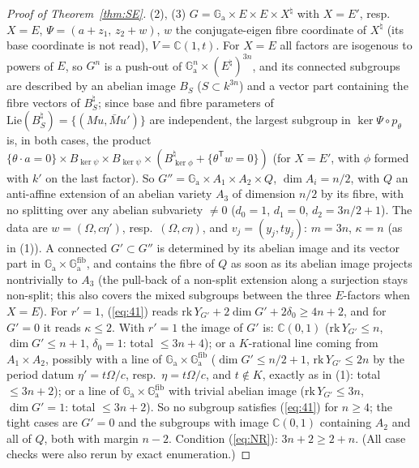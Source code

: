 \documentclass[11pt]{amsart}
\theoremstyle{definition}
\newcommand{\C}{\mathbb{C}}
\newcommand{\Ga}{\mathbb{G}_{\mathrm a}}
\begin{document}
\begin{proof}[Proof of Theorem~\ref{thm:SE}]
(2), (3) $G=\Ga\times E\times E\times X^\natural$ with $X=E'$, resp.\ $X=E$, $\Psi=(a+z_1,\,z_2+w)$, $w$ the conjugate-eigen
fibre coordinate of $X^\natural$ (its base coordinate is not read), $V=\C(1,t)$. For $X=E$ all factors are isogenous to
powers of $E$, so $G^n$ is a push-out of $\Ga^n\times(E^\natural)^{3n}$, and its connected subgroups are described by an
abelian image $B_S$ ($S\subset k^{3n}$) and a vector part containing the fibre vectors of $B_S^\natural$; since base and
fibre parameters of $\mathrm{Lie}(B_S^\natural)=\{(Mu,\bar Mu')\}$ are independent, the largest subgroup in
$\ker\Psi\circ p_\theta$ is, in both cases, the product
$\{\theta\cdot a=0\}\times B_{\ker\psi}\times B_{\ker\psi}\times(B^\natural_{\ker\phi}+\{\theta^{\mathsf T}w=0\})$ (for
$X=E'$, with $\phi$ formed with $k'$ on the last factor). So
$G''=\Ga\times A_1\times A_2\times Q$, $\dim A_i=n/2$, with $Q$ an anti-affine extension of an abelian variety $A_3$ of
dimension $n/2$ by its fibre, with no splitting over any abelian subvariety $\ne0$ ($d_0=1$, $d_1=0$, $d_2=3n/2+1$). The
data are $w=(\Omega,c\eta')$, resp.\ $(\Omega,c\eta)$, and $v_j=(y_j,ty_j)$: $m=3n$, $\kappa=n$ (as in (1)). A connected
$G'\subset G''$ is determined by its abelian image and its vector part in $\Ga\times\Ga^{\mathrm{fib}}$, and contains the
fibre of $Q$ as soon as its abelian image projects nontrivially to $A_3$ (the pull-back of a non-split extension along a
surjection stays non-split; this also covers the mixed subgroups between the three $E$-factors when $X=E$). For $r'=1$,
(\ref{eq:41}) reads $\mathrm{rk}\,Y_{G'}+2\dim G'+2\delta_0\ge4n+2$, and for $G'=0$ it reads $\kappa\le2$. With $r'=1$ the
image of $G'$ is: $\C(0,1)$ ($\mathrm{rk}\,Y_{G'}\le n$, $\dim G'\le n+1$, $\delta_0=1$: total $\le3n+4$); or a $K$-rational line
coming from $A_1\times A_2$, possibly with a line of $\Ga\times\Ga^{\mathrm{fib}}$ ($\dim G'\le n/2+1$,
$\mathrm{rk}\,Y_{G'}\le2n$ by the period datum $\eta'=t\Omega/c$, resp.\ $\eta=t\Omega/c$, and $t\notin K$, exactly as in (1):
total $\le3n+2$); or a line of $\Ga\times\Ga^{\mathrm{fib}}$ with trivial abelian image ($\mathrm{rk}\,Y_{G'}\le3n$, $\dim G'=1$:
total $\le3n+2$). So no subgroup satisfies (\ref{eq:41}) for $n\ge4$; the tight cases are $G'=0$ and the subgroups with
image $\C(0,1)$ containing $A_2$ and all of $Q$, both with margin $n-2$. Condition (\ref{eq:NR}): $3n+2\ge2+n$. (All case
checks were also rerun by exact enumeration.)
\end{proof}
\end{document}
